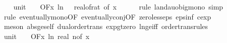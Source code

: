 \begin{isabellebody}
\isanewline
\ \ \isamarkupfalse%
\ unit{\isacharunderscore}{\kern0pt}{}{\isacharcolon}{\kern0pt}\ {\isachardoublequoteopen}{\isacharparenleft}{\kern0pt}{\isasymlambda}{\isacharunderscore}{\kern0pt}{\isachardot}{\kern0pt}\ {}{\isacharparenright}{\kern0pt}\ {\isasymin}\ O{\isacharbrackleft}{\kern0pt}{\isacharquery}{\kern0pt}F{\isacharbrackright}{\kern0pt}{\isacharparenleft}{\kern0pt}{\isasymlambda}x{\isachardot}{\kern0pt}\ ln\ {\isacharparenleft}{\kern0pt}{}\ {\isacharslash}{\kern0pt}\ real{\isacharunderscore}{\kern0pt}of{\isacharunderscore}{\kern0pt}rat\ {\isacharparenleft}{\kern0pt}{\isasymepsilon}{\isacharunderscore}{\kern0pt}of\ x{\isacharparenright}{\kern0pt}{\isacharparenright}{\kern0pt}{\isacharparenright}{\kern0pt}{\isachardoublequoteclose}\isanewline
\ \ \ \ \isamarkupfalse%
\ {\isacharparenleft}{\kern0pt}rule\ landau{\isacharunderscore}{\kern0pt}o{\isachardot}{\kern0pt}big{\isacharunderscore}{\kern0pt}mono{\isacharcomma}{\kern0pt}\ simp{\isacharparenright}{\kern0pt}\isanewline
\ \ \ \ \isamarkupfalse%
\ {\isacharparenleft}{\kern0pt}rule\ eventually{\isacharunderscore}{\kern0pt}mono{\isacharbrackleft}{\kern0pt}OF\ eventually{\isacharunderscore}{\kern0pt}conj{\isacharbrackleft}{\kern0pt}OF\ zero{\isacharunderscore}{\kern0pt}less{\isacharunderscore}{\kern0pt}eps\ eps{\isacharunderscore}{\kern0pt}inf{\isacharbrackleft}{\kern0pt}\ c{\isacharequal}{\kern0pt}{\isachardoublequoteopen}exp\ {}{\isachardoublequoteclose}{\isacharbrackright}{\kern0pt}{\isacharbrackright}{\kern0pt}{\isacharbrackright}{\kern0pt}{\isacharparenright}{\kern0pt}\isanewline
\ \ \ \ \isamarkupfalse%
\ {\isacharparenleft}{\kern0pt}meson\ abs{\isacharunderscore}{\kern0pt}ge{\isacharunderscore}{\kern0pt}self\ dual{\isacharunderscore}{\kern0pt}order{\isachardot}{\kern0pt}trans\ exp{\isacharunderscore}{\kern0pt}gt{\isacharunderscore}{\kern0pt}zero\ ln{\isacharunderscore}{\kern0pt}ge{\isacharunderscore}{\kern0pt}iff\ order{\isacharunderscore}{\kern0pt}trans{\isacharunderscore}{\kern0pt}rules{\isacharparenleft}{\kern0pt}{}{}{\isacharparenright}{\kern0pt}{\isacharparenright}{\kern0pt}\isanewline
\isanewline
\ \ \isamarkupfalse%
\ unit{\isacharunderscore}{\kern0pt}{}{}{\isacharcolon}{\kern0pt}\ {\isachardoublequoteopen}{\isacharparenleft}{\kern0pt}{\isasymlambda}{\isacharunderscore}{\kern0pt}{\isachardot}{\kern0pt}\ {}{\isacharparenright}{\kern0pt}\ {\isasymin}\ O{\isacharbrackleft}{\kern0pt}{\isacharquery}{\kern0pt}F{\isacharbrackright}{\kern0pt}{\isacharparenleft}{\kern0pt}{\isasymlambda}x{\isachardot}{\kern0pt}\ ln\ {\isacharparenleft}{\kern0pt}real\ {\isacharparenleft}{\kern0pt}n{\isacharunderscore}{\kern0pt}of\ x{\isacharparenright}{\kern0pt}{\isacharparenright}{\kern0pt}{\isacharparenright}{\kern0pt}{\isachardoublequoteclose}\isanewline

\end{isabellebody}
